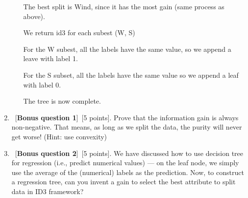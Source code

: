 \documentclass[12pt, fullpage,letterpaper]{article}
\begin{document}
\begin{enumerate}
\begin{enumerate}
The best split is Wind, since it has the most gain (same process as above).

We return id3 for each subest (W, S)

For the W subest, all the labels have the same value, so we append a leave with label 1.

For the S subset, all the labels have the same value so we append a leaf with label 0.

The tree is now complete.

\end{enumerate}
\item ~[\textbf{Bonus question 1}]~[5 points].  Prove that the information gain is always non-negative.  That means, as long as we split the data, the purity will never get worse! (Hint: use convexity)
\item ~[\textbf{Bonus question 2}]~[5 points].  We have discussed how to use decision tree for regression (i.e., predict numerical values) --- on the leaf node, we simply use the average of the (numerical) labels as the prediction.  Now, to construct a regression tree, can you invent a gain to select the best attribute to split data in ID3 framework?

\end{enumerate}
\end{document}
